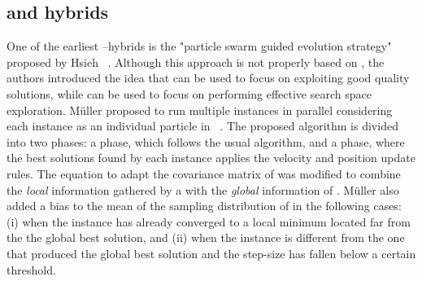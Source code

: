 \subsection{\PSO and \CMAES hybrids}
One of the earliest \PSO--\ESs hybrids is the "particle swarm guided evolution strategy" proposed by Hsieh \etal~\cite{HsiCheChe07:gecco}.
Although this approach is not properly based on \CMAES, the authors introduced the idea that \ESs can be used to focus on exploiting good quality solutions, while \PSO can be used to focus on performing effective search space exploration.
%
Müller \etal proposed to run multiple \CMAES instances in parallel considering each instance as an individual particle in \PSO~\cite{MulBauSba09:ieee-cec}.
The proposed algorithm is divided into two phases: a \CMAES phase, which follows the usual \CMAES algorithm, and a \PSO phase, where the best solutions found by each \CMAES instance applies the \stanPSO velocity and position update rules.
The equation to adapt the covariance matrix of \CMAES was modified to combine the \textit{local} information gathered by a \CMAES with the \textit{global} information of \PSO.
Müller \etal also added a bias to the mean of the sampling distribution of \CMAES in the following cases: (i) when the instance has already converged to a local minimum located far from the the global best solution, and (ii) when the instance is different from the one that produced the global best solution and the step-size has fallen below a certain threshold.
